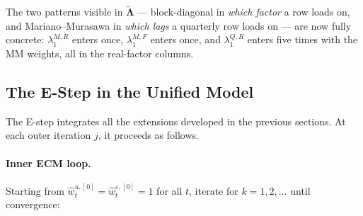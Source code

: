 \documentclass[11pt, a4paper, oneside]{article}
\newcommand{\mL}{\boldsymbol{\Lambda}}
\begin{document}
The two patterns visible in $\tilde{\mL}$ — block-diagonal in
\emph{which factor} a row loads on, and Mariano--Murasawa in
\emph{which lags} a quarterly row loads on — are now fully concrete:
$\lambda^{M,R}_1$ enters once, $\lambda^{M,F}_1$ enters once, and
$\lambda^{Q,R}_1$ enters five times with the MM weights, all in the
real-factor columns.

\newpage

\subsection{The E-Step in the Unified Model}
\label{subsec:full-e-step}

The E-step integrates all the extensions developed in the previous
sections. At each outer iteration $j$, it proceeds as follows.

\paragraph{Inner ECM loop.}
Starting from $\hat{w}^{u,[0]}_t = \hat{w}^{\varepsilon,[0]}_t = 1$
for all $t$, iterate for $k = 1, 2, \ldots$ until convergence:
\end{document}
